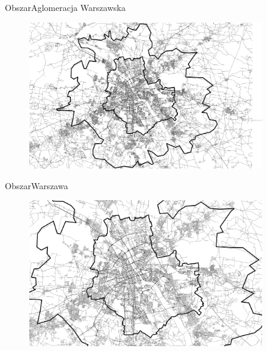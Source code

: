 \documentclass[8pt]{beamer}
\begin{document}
\begin{frame}{Obszar}{Aglomeracja Warszawska}
\begin{figure}
\begin{center}
\includegraphics[width=0.9\textwidth]{n3}
 \end{center} 
 \end{figure} 
\end{frame}

\begin{frame}{Obszar}{Warszawa}
\begin{figure}
\begin{center}
\includegraphics[width=0.9\textwidth]{n4}
 \end{center} 
 \end{figure} 
\end{frame}
\end{document}
